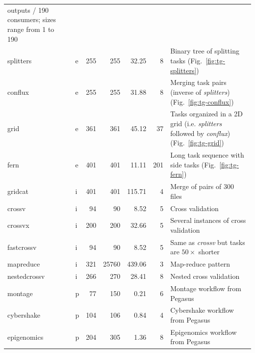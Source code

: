 \begin{table}[h]
\begin{tabular}{l|lrrrr|T}
		outputs / 190 consumers; sizes range from 1 to \SI{190}{\mebi\byte}                        \\
		splitters        & e & 255 & 255   & 32.25  & 8   & Binary tree of
		splitting tasks (Fig.~\ref{fig:tg-splitters})                                              \\
		conflux          & e & 255 & 255   & 31.88  & 8   & Merging task pairs
		(inverse of \emph{splitters}) (Fig.~\ref{fig:tg-conflux})                                  \\
		grid             & e & 361 & 361   & 45.12  & 37  & Tasks organized in a 2D grid
		(i.e. \emph{splitters} followed by \emph{conflux}) (Fig.~\ref{fig:tg-grid})
		\\
		fern             & e & 401 & 401   & 11.11  & 201 & Long task sequence with
		side tasks (Fig.~\ref{fig:tg-fern})                                                        \\ \hline
		gridcat          & i & 401 & 401   & 115.71 & 4   & Merge of pairs of \SI{300}{\mebi\byte}
		files                                                                                      \\
		crossv           & i & 94  & 90    & 8.52   & 5   & Cross validation                       \\
		crossvx          & i & 200 & 200   & 32.66  & 5   & Several instances of cross
		validation                                                                                 \\
		fastcrossv       & i & 94  & 90    & 8.52   & 5   & Same as \emph{crossv}
		but tasks are $50\times$ shorter                                                           \\
		mapreduce        & i & 321 & 25760 & 439.06 & 3   & Map-reduce pattern                     \\
		nestedcrossv     & i & 266 & 270   & 28.41  & 8   & Nested cross
		validation                                                                                 \\ \hline
		montage          & p & 77  & 150   & 0.21   & 6   & Montage workflow
		from Pegasus                                                                               \\
		cybershake       & p & 104 & 106   & 0.84   & 4   & Cybershake
		workflow from Pegasus                                                                      \\
		epigenomics      & p & 204 & 305   & 1.36   & 8   & Epigenomics
		workflow from Pegasus                                                                      \\

\end{tabular}
\end{table}
